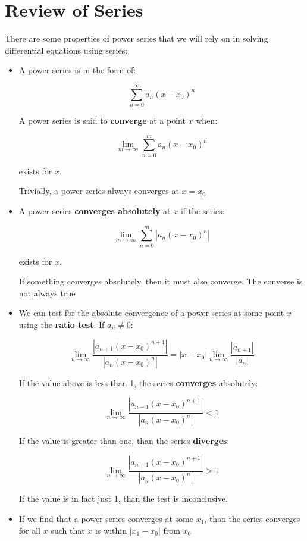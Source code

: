 \documentclass{report}
\begin{document}
\section{Review of Series}
There are some properties of power series that we will rely on in solving differential equations using series:


\begin{itemize}
    \item A power series is in the form of:
    
    $$\sum_{n=0}^{\infty}a_n(x-x_0)^n$$
    
    A power series is said to \textbf{converge} at a point $x$ when:
    
    $$\lim_{m \to \infty}\sum_{n=0}^{m}a_n(x-x_0)^n$$
    
    exists for $x$. 
    
    Trivially, a power series always converges at $x = x_0$
    
    \item A power series \textbf{converges absolutely} at $x$ if the series:
    
    $$\lim_{m \to \infty}\sum_{n=0}^{m}|a_n(x-x_0)^n|$$
    
    exists for $x$.
    
    If something converges absolutely, then it must also converge. The converse is not always true
    
    \item We can test for the absolute convergence of a power series at some point $x$ using the \textbf{ratio test}. If $a_n \neq 0$:
    
    $$\lim_{n\to \infty} \frac{|a_{n+1}(x-x_0)^{n+1}|}{|a_n(x-x_0)^n|}
    = |x-x_0|\lim_{n\to \infty} \frac{|a_{n+1}|}{|a_n|}$$
    
    If the value above is less than 1, the series \textbf{converges} absolutely:
    
    $$
    \lim_{n\to \infty} \frac{|a_{n+1}(x-x_0)^{n+1}|}{|a_n(x-x_0)^n|} < 1
    $$
    
    If the value is greater than one, than the series \textbf{diverges}:
    
    $$
    \lim_{n\to \infty} \frac{|a_{n+1}(x-x_0)^{n+1}|}{|a_n(x-x_0)^n|} > 1
    $$
    
    If the value is in fact just 1, than the test is inconclusive. 
    
    
    \item If we find that a power series converges at some $x_1$, than the series converges for all $x$ such that $x$ is within $|x_1-x_0|$ from $x_0$
    

\end{itemize}
\end{document}
